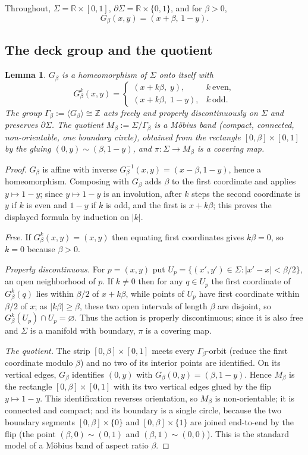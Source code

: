 \documentclass[11pt]{article}
\newtheorem{lemma}{Lemma}
\theoremstyle{definition}
\newcommand{\Z}{\mathbb{Z}}
\newcommand{\R}{\mathbb{R}}
\newcommand{\Sg}{\Sigma}
\newcommand{\bd}{\partial}
\newcommand{\abs}[1]{\lvert #1 \rvert}
\begin{document}
Throughout, $\Sg=\R\times[0,1]$, $\bd\Sg=\R\times\{0,1\}$, and for $\beta>0$,
\[
G_\beta(x,y)=(x+\beta,\,1-y).
\]

\subsection{The deck group and the quotient}

\begin{lemma}\label{lem:group}
$G_\beta$ is a homeomorphism of $\Sg$ onto itself with
\[
G_\beta^{k}(x,y)=
\begin{cases}
(x+k\beta,\;y), & k\ \text{even},\\[2pt]
(x+k\beta,\;1-y), & k\ \text{odd}.
\end{cases}
\]
The group $\Gamma_\beta:=\langle G_\beta\rangle\cong\Z$ acts freely and properly
discontinuously on $\Sg$ and preserves $\bd\Sg$. The quotient
$M_\beta:=\Sg/\Gamma_\beta$ is a M\"obius band (compact, connected, non-orientable, one
boundary circle), obtained from the rectangle $[0,\beta]\times[0,1]$ by the gluing
$(0,y)\sim(\beta,1-y)$, and $\pi:\Sg\to M_\beta$ is a covering map.
\end{lemma}

\begin{proof}
$G_\beta$ is affine with inverse $G_\beta^{-1}(x,y)=(x-\beta,1-y)$, hence a homeomorphism.
Composing with $G_\beta$ adds $\beta$ to the first coordinate and applies $y\mapsto 1-y$;
since $y\mapsto 1-y$ is an involution, after $k$ steps the second coordinate is $y$ if $k$
is even and $1-y$ if $k$ is odd, and the first is $x+k\beta$; this proves the displayed
formula by induction on $\abs{k}$.

\emph{Free.} If $G_\beta^k(x,y)=(x,y)$ then equating first coordinates gives $k\beta=0$, so
$k=0$ because $\beta>0$.

\emph{Properly discontinuous.} For $p=(x,y)$ put $U_p=\{(x',y')\in\Sg:\abs{x'-x}<\beta/2\}$,
an open neighborhood of $p$. If $k\ne0$ then for any $q\in U_p$ the first coordinate of
$G_\beta^k(q)$ lies within $\beta/2$ of $x+k\beta$, while points of $U_p$ have first
coordinate within $\beta/2$ of $x$; as $\abs{k\beta}\ge\beta$, these two open intervals of
length $\beta$ are disjoint, so $G_\beta^k(U_p)\cap U_p=\varnothing$. Thus the action is
properly discontinuous; since it is also free and $\Sg$ is a manifold with boundary,
$\pi$ is a covering map.

\emph{The quotient.} The strip $[0,\beta]\times[0,1]$ meets every $\Gamma_\beta$-orbit
(reduce the first coordinate modulo $\beta$) and no two of its interior points are
identified. On its vertical edges, $G_\beta$ identifies $(0,y)$ with
$G_\beta(0,y)=(\beta,1-y)$. Hence $M_\beta$ is the rectangle $[0,\beta]\times[0,1]$ with its
two vertical edges glued by the flip $y\mapsto 1-y$. This identification reverses
orientation, so $M_\beta$ is non-orientable; it is connected and compact; and its boundary
is a single circle, because the two boundary segments $[0,\beta]\times\{0\}$ and
$[0,\beta]\times\{1\}$ are joined end-to-end by the flip (the point $(\beta,0)\sim(0,1)$ and
$(\beta,1)\sim(0,0)$). This is the standard model of a M\"obius band of aspect ratio
$\beta$.
\end{proof}
\end{document}

